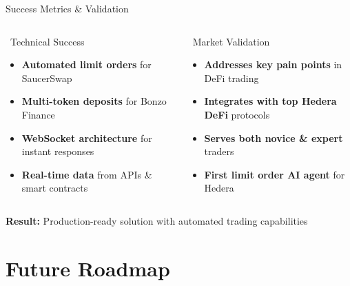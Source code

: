 \documentclass[aspectratio=169]{beamer}
\begin{document}
\begin{frame}{Success Metrics \& Validation}
\begin{columns}
\begin{block}{\faCheckCircle\ Technical Success}
\begin{itemize}
\item \textbf{Automated limit orders} for SaucerSwap
\item \textbf{Multi-token deposits} for Bonzo Finance
\item \textbf{WebSocket architecture} for instant responses
\item \textbf{Real-time data} from APIs \& smart contracts
\end{itemize}
\end{block}

\begin{block}{\faUsers\ Market Validation}
\begin{itemize}
\item \textbf{Addresses key pain points} in DeFi trading
\item \textbf{Integrates with top Hedera DeFi} protocols
\item \textbf{Serves both novice \& expert} traders
\item \textbf{First limit order AI agent} for Hedera
\end{itemize}
\end{block}
\end{columns}

\vspace{0.05cm}
\begin{center}
\footnotesize \textbf{Result:} Production-ready solution with automated trading capabilities
\end{center}
\end{frame}

\section{Future Roadmap}
\end{document}
